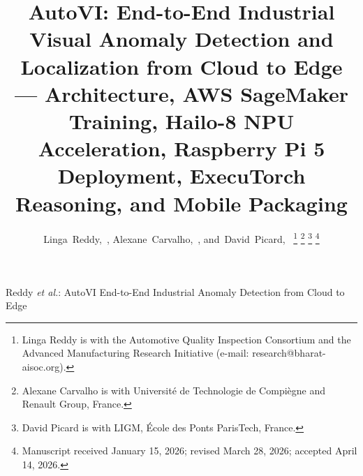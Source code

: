 \documentclass[journal,twocolumn]{IEEEtran}
\begin{document}
\title{AutoVI: End-to-End Industrial Visual Anomaly Detection and Localization from Cloud to Edge --- Architecture, AWS SageMaker Training, Hailo-8 NPU Acceleration, Raspberry Pi 5 Deployment, ExecuTorch Reasoning, and Mobile Packaging}

\author{Linga~Reddy,~,
        Alexane~Carvalho,~,
        and~David~Picard,~%
\thanks{Linga Reddy is with the Automotive Quality Inspection Consortium and the Advanced Manufacturing Research Initiative (e-mail: research@bharat-aisoc.org).}%
\thanks{Alexane Carvalho is with Université de Technologie de Compiègne and Renault Group, France.}%
\thanks{David Picard is with LIGM, École des Ponts ParisTech, France.}%
\thanks{Manuscript received January 15, 2026; revised March 28, 2026; accepted April 14, 2026.}}

%
{Reddy \MakeLowercase{\textit{et al.}}: AutoVI End-to-End Industrial Anomaly Detection from Cloud to Edge}

\maketitle
\end{document}
